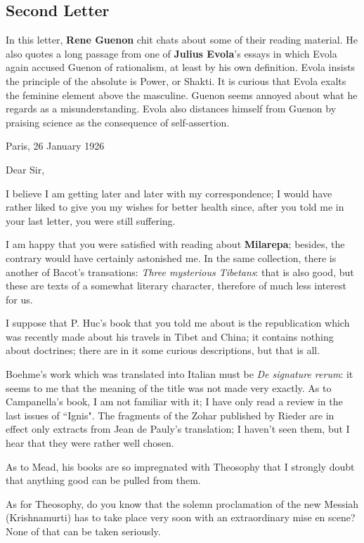 \subsection{Second Letter}

\begin{quotex}
In this letter, \textbf{Rene Guenon} chit chats about some of their reading material. He also quotes a long passage from one of \textbf{Julius Evola}'s essays in which Evola again accused Guenon of rationalism, at least by his own definition. Evola insists the principle of the absolute is Power, or Shakti. It is curious that Evola exalts the feminine element above the masculine. Guenon seems annoyed about what he regards as a misunderstanding. Evola also distances himself from Guenon by praising science as the consequence of self-assertion. 

\end{quotex}
Paris, 26 January 1926

Dear Sir,

I believe I am getting later and later with my correspondence; I would have rather liked to give you my wishes for better health since, after you told me in your last letter, you were still suffering.

I am happy that you were satisfied with reading about \textbf{Milarepa}; besides, the contrary would have certainly astonished me. In the same collection, there is another of Bacot's transations: \emph{Three mysterious Tibetans}: that is also good, but these are texts of a somewhat literary character, therefore of much less interest for us.

I suppose that P. Huc's book that you told me about is the republication which was recently made about his travels in Tibet and China; it contains nothing about doctrines; there are in it some curious descriptions, but that is all.

Boehme's work which was translated into Italian must be \emph{De signature rerum}: it seems to me that the meaning of the title was not made very exactly. As to Campanella's book, I am not familiar with it; I have only read a review in the last issues of ``Ignis". The fragments of the Zohar published by Rieder are in effect only extracts from Jean de Pauly's translation; I haven't seen them, but I hear that they were rather well chosen.

As to Mead, his books are so impregnated with Theosophy that I strongly doubt that anything good can be pulled from them.

As for Theosophy, do you know that the solemn proclamation of the new Messiah (Krishnamurti) has to take place very soon with an extraordinary mise en scene? None of that can be taken seriously.

